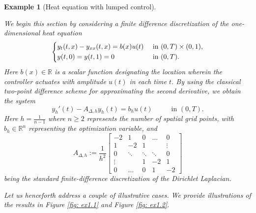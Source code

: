 \documentclass[journal,twoside,web]{ieeecolor}
\newcommand{\R}{\mathbb{R}}
\newtheorem{example}{Example}
\begin{document}
	\begin{example}[Heat equation with lumped control] \label{ex: 1}
	
	We begin this section by considering a finite difference discretization of the one-dimensional heat equation
	\begin{equation*}
	\begin{dcases}
	y_t(t,x) - y_{xx}(t,x) = b(x) u(t) &\text{ in } (0,T)\times (0,1),\\
	y(t,0) = y(t,1) = 0 &\text{ in } (0,T).\\
	\end{dcases}
	\end{equation*}
	Here $b(x)\in\R$ is a scalar function designating the location wherein the controller actuates with amplitude $u(t)$ in each time $t$.
	By using the classical two-point difference scheme for approximating the second derivative, we obtain the system 
	\begin{equation}
	y_h'(t) - A_{\Delta,h}y_h(t) = b_h u(t) \hspace{1cm} \text{ in } (0,T).
	\end{equation}
	Here $h=\frac{1}{n-1}$ where $n\geqslant2$ represents the number of spatial grid points, with $b_h\in \R^n$ representing the optimization variable, and
	\begin{equation*}
	A_{\Delta,h} := 
	\frac{1}{h^2}\begin{bmatrix} 
           -2& 1& 0& \ldots& 0 \\ 
           1& -2& 1& & \vdots \\
           0& \ddots &\ddots& \ddots& 0 \\
           \vdots& & 1 & -2 & 1 \\
           0& \hdots &0 &1 & -2 
    \end{bmatrix}
	\end{equation*}
	being the standard finite-difference discretization of the Dirichlet Laplacian. 
	
	Let us henceforth address a couple of illustrative cases. We provide illustrations of the results in Figure \ref{fig: ex1.1} and Figure \ref{fig: ex1.2}.
	\smallskip
	

\end{example}
\end{document}
